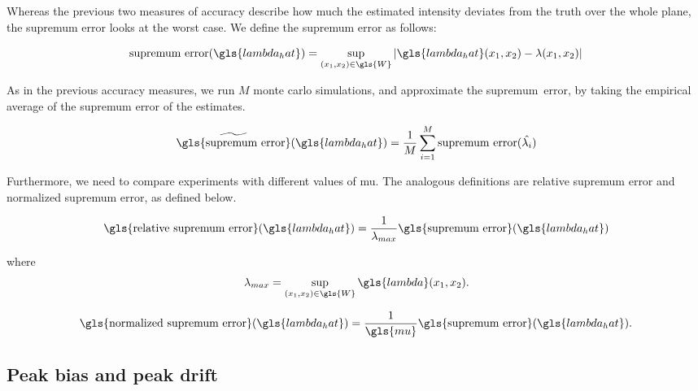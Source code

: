 Whereas the previous two measures of accuracy describe how much the estimated intensity deviates from the truth over the whole plane,
the \gls{supremum error} looks at the worst case.
We define the \gls{supremum error} as follows:

\begin{equation}
    \mbox{supremum error}(\gls{lambda_hat}) = \sup_{\xvec \in \gls{W}}
        {\left|
            \gls{lambda_hat}\xvec - \lambda\xvec
        \right|}
\end{equation}

As in the previous accuracy measures, we run $M$ monte carlo simulations, and approximate the \mbox{supremum error}, by taking the empirical average of the supremum error of the estimates.

\begin{equation}
    \widetilde{\mbox{\gls{supremum error}}}(\gls{lambda_hat}) = \frac{1}{M} \sum_{i=1}^{M} \mbox{supremum error}(\hat{\lambda_i})
\end{equation}

Furthermore, we need to compare experiments with different values of \gls{mu}.
The analogous definitions are \gls{relative supremum error} and \gls{normalized supremum error}, as defined below.

\begin{equation}
\label{eq:relative_supremum_error}
    \mbox{\gls{relative supremum error}}(\gls{lambda_hat}) = 
        \frac{1}{\lambda_{max}} \mbox{\gls{supremum error}}(\gls{lambda_hat}) \\
\end{equation}

where
\begin{equation}
\label{eq:lambda_max}
    \lambda_{max} = \sup_{\xvec \in \gls{W}}{\gls{lambda}\xvec} \text{.}
\end{equation}

\begin{equation}
\label{eq:normalized_supremum_error}
    \mbox{\gls{normalized supremum error}}(\gls{lambda_hat}) = 
        \frac{1}{\gls{mu}} \mbox{\gls{supremum error}}(\gls{lambda_hat}) \text{.}
\end{equation}

\subsection{Peak bias and peak drift}
\label{subsec:method:peak_bias}

